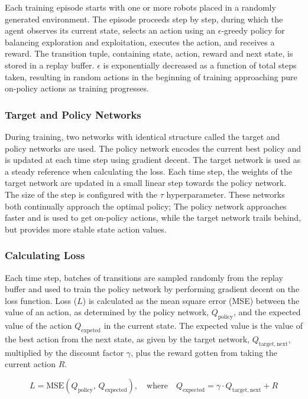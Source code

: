 Each training episode starts with one or more robots placed in a randomly generated environment. The episode proceeds step by step, during which the agent observes its current state, selects an action using an $\epsilon$-greedy policy for balancing exploration and exploitation, executes the action, and receives a reward. The transition tuple, containing state, action, reward and next state, is stored in a replay buffer. $\epsilon$ is exponentially decreased as a function of total steps taken, resulting in random actions in the beginning of training approaching pure on-policy actions as training progresses. \\

\subsubsection{Target and Policy Networks}
During training, two networks with identical structure called the target and policy networks are used. The policy network encodes the current best policy and is updated at each time step using gradient decent. The target network is used as a steady reference when calculating the loss. Each time step, the weights of the target network are updated in a small linear step towards the policy network. The size of the step is configured with the $\tau$ hyperparameter. These networks both continually approach the optimal policy; The policy network approaches faster and is used to get on-policy actions, while the target network trails behind, but provides more stable state action values.

\subsubsection{Calculating Loss}
Each time step, batches of transitions are sampled randomly from the replay buffer and used to train the policy network by performing gradient decent on the loss function. Loss ($L$) is calculated as the mean square error (MSE) between the value of an action, as determined by the policy network, $Q_\mathrm{policy}$, and the expected value of the action $Q_\mathrm{expeted}$ in the current state. The expected value is the value of the best action from the next state, as given by the target network, $Q_{\mathrm{target},\mathrm{next}}$, multiplied by the discount factor $\gamma$, plus the reward gotten from taking the current action $R$.

\begin{equation}
    L = \mathrm{MSE}(Q_\mathrm{policy},\, Q_\mathrm{expected}), \quad \text{where}\quad
    Q_\mathrm{expected} = \gamma \cdot Q_{\mathrm{target},\mathrm{next}} + R
\end{equation}

